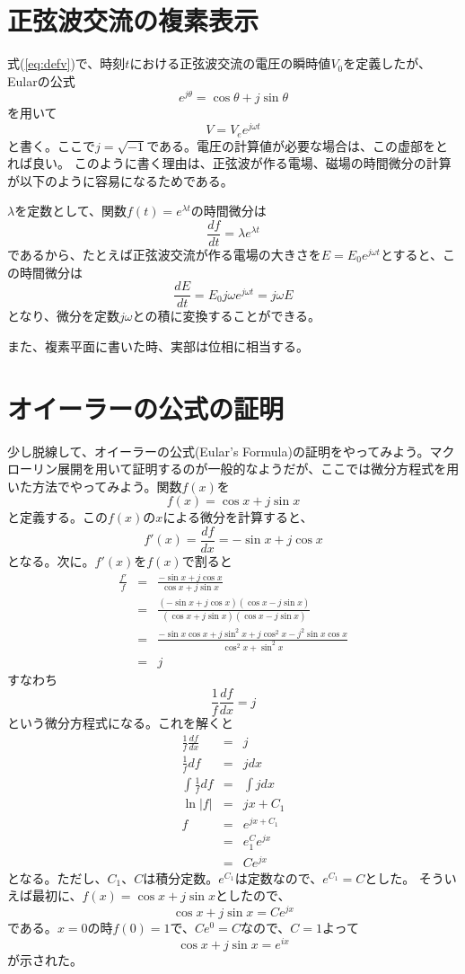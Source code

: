 \section{正弦波交流の複素表示}
式(\ref{eq:defv})で、時刻$t$における正弦波交流の電圧の瞬時値$V_0$を定義したが、
Eularの公式
\[
e^{j\theta} = \cos\theta + j\sin\theta
\]
を用いて
\begin{equation}
V = V_e e^{j\omega t} \label{eq:sinwave}
\end{equation}
と書く。ここで$j=\sqrt{-1}$である。電圧の計算値が必要な場合は、この虚部をとれば良い。
このように書く理由は、正弦波が作る電場、磁場の時間微分の計算が以下のように容易になるためである。

$\lambda$を定数として、関数$f(t)=e^{\lambda t}$の時間微分は
\[
\frac{df}{dt}=\lambda e^{\lambda t}
\]
であるから、たとえば正弦波交流が作る電場の大きさを$E=E_0e^{j\omega t}$とすると、この時間微分は
\[
\frac{dE}{dt} = E_0 j\omega e^{j \omega t} = j\omega E
\]
となり、微分を定数$j\omega$との積に変換することができる。

また、複素平面に書いた時、実部は位相に相当する。

\section{オイーラーの公式の証明}
少し脱線して、オイーラーの公式(Eular's Formula)の証明をやってみよう。マクローリン展開を用いて証明するのが一般的なようだが、ここでは微分方程式を用いた方法でやってみよう。関数$f(x)$を
\[
f(x) = \cos x + j\sin x
\]
と定義する。この$f(x)$の$x$による微分を計算すると、
\[
f'(x) = \frac{df}{dx} = -\sin x + j\cos x
\]
となる。次に。$f'(x)$を$f(x)$で割ると
\begin{eqnarray*}
\frac{f'}{f} &=& \frac{-\sin x + j\cos x}{\cos x + j\sin x}\\
&=&\frac{(-\sin x + j\cos x)(\cos x - j\sin x)}{(\cos x + j\sin x)(\cos x - j\sin x)}\\
&=&\frac{-\sin x \cos x + j\sin^2 x + j\cos^2 x -j^2\sin x \cos x}{\cos^2 x + \sin^2 x}\\
&=&j
\end{eqnarray*}
すなわち
\[
\frac{1}{f}\frac{df}{dx} = j
\]
という微分方程式になる。これを解くと
\begin{eqnarray*}
\frac{1}{f}\frac{df}{dx} &=& j\\
\frac{1}{f}df &=& jdx\\
\int \frac{1}{f} df &=& \int j dx\\
\ln|f| &=& jx + C_1\\
f &=& e^{jx+C_1}\\
  &=& e^C_1e^{jx}\\
 &=& C e^{jx}
\end{eqnarray*}
となる。ただし、$C_1$、$C$は積分定数。$e^{C_1}$は定数なので、$e^{C_1}=C$とした。
そういえば最初に、$f(x)=\cos x + j\sin x$としたので、
\[
\cos x + j\sin x = C e^{jx}
\]
である。$x=0$の時$f(0) = 1$で、$C e^{0} = C$なので、$C=1$よって
\[
\cos x + j\sin x = e^{ix}
\]
が示された。

